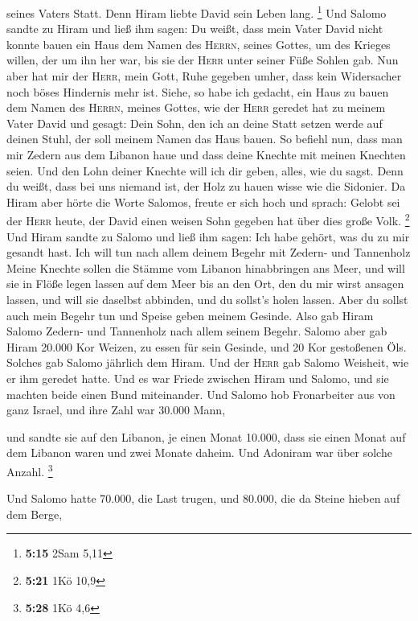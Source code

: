 seines Vaters Statt. Denn Hiram liebte David sein Leben lang.
\footnote{\textbf{5:15} 2Sam 5,11}  Und Salomo sandte zu
Hiram und ließ ihm sagen:  Du weißt, dass mein Vater
David nicht konnte bauen ein Haus dem Namen des \textsc{Herrn}, seines
Gottes, um des Krieges willen, der um ihn her war, bis sie der
\textsc{Herr} unter seiner Füße Sohlen gab.  Nun aber hat
mir der \textsc{Herr}, mein Gott, Ruhe gegeben umher, dass kein
Widersacher noch böses Hindernis mehr ist.  Siehe, so
habe ich gedacht, ein Haus zu bauen dem Namen des \textsc{Herrn}, meines
Gottes, wie der \textsc{Herr} geredet hat zu meinem Vater David und
gesagt: Dein Sohn, den ich an deine Statt setzen werde auf deinen Stuhl,
der soll meinem Namen das Haus bauen.  So befiehl nun,
dass man mir Zedern aus dem Libanon haue und dass deine Knechte mit
meinen Knechten seien. Und den Lohn deiner Knechte will ich dir geben,
alles, wie du sagst. Denn du weißt, dass bei uns niemand ist, der Holz
zu hauen wisse wie die Sidonier.  Da Hiram aber hörte die
Worte Salomos, freute er sich hoch und sprach: Gelobt sei der
\textsc{Herr} heute, der David einen weisen Sohn gegeben hat über dies
große Volk. \footnote{\textbf{5:21} 1Kö 10,9}  Und Hiram
sandte zu Salomo und ließ ihm sagen: Ich habe gehört, was du zu mir
gesandt hast. Ich will tun nach allem deinem Begehr mit Zedern- und
Tannenholz  Meine Knechte sollen die Stämme vom Libanon
hinabbringen ans Meer, und will sie in Flöße legen lassen auf dem Meer
bis an den Ort, den du mir wirst ansagen lassen, und will sie daselbst
abbinden, und du sollst's holen lassen. Aber du sollst auch mein Begehr
tun und Speise geben meinem Gesinde.  Also gab Hiram
Salomo Zedern- und Tannenholz nach allem seinem Begehr. 
Salomo aber gab Hiram 20.000 Kor Weizen, zu essen für sein Gesinde, und
20 Kor gestoßenen Öls. Solches gab Salomo jährlich dem Hiram.
 Und der \textsc{Herr} gab Salomo Weisheit, wie er ihm
geredet hatte. Und es war Friede zwischen Hiram und Salomo, und sie
machten beide einen Bund miteinander.  Und Salomo hob
Fronarbeiter aus von ganz Israel, und ihre Zahl war 30.000 Mann,

 und sandte sie auf den Libanon, je einen Monat 10.000,
dass sie einen Monat auf dem Libanon waren und zwei Monate daheim. Und
Adoniram war über solche Anzahl. \footnote{\textbf{5:28} 1Kö 4,6}

 Und Salomo hatte 70.000, die Last trugen, und 80.000,
die da Steine hieben auf dem Berge,

